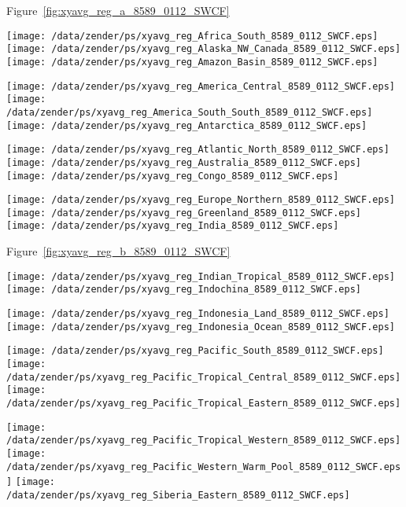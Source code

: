 \documentclass[agupp]{aguplus}
\begin{document}
Figure~\ref{fig:xyavg_reg_a_8589_0112_SWCF}
\begin{figure*}
\texttt{[image: /data/zender/ps/xyavg\_reg\_Africa\_South\_8589\_0112\_SWCF.eps]}%
\texttt{[image: /data/zender/ps/xyavg\_reg\_Alaska\_NW\_Canada\_8589\_0112\_SWCF.eps]}%
\texttt{[image: /data/zender/ps/xyavg\_reg\_Amazon\_Basin\_8589\_0112\_SWCF.eps]}%

\texttt{[image: /data/zender/ps/xyavg\_reg\_America\_Central\_8589\_0112\_SWCF.eps]}%
\texttt{[image: /data/zender/ps/xyavg\_reg\_America\_South\_South\_8589\_0112\_SWCF.eps]}%
\texttt{[image: /data/zender/ps/xyavg\_reg\_Antarctica\_8589\_0112\_SWCF.eps]}%

\texttt{[image: /data/zender/ps/xyavg\_reg\_Atlantic\_North\_8589\_0112\_SWCF.eps]}%
\texttt{[image: /data/zender/ps/xyavg\_reg\_Australia\_8589\_0112\_SWCF.eps]}%
\texttt{[image: /data/zender/ps/xyavg\_reg\_Congo\_8589\_0112\_SWCF.eps]}%

\texttt{[image: /data/zender/ps/xyavg\_reg\_Europe\_Northern\_8589\_0112\_SWCF.eps]}%
\texttt{[image: /data/zender/ps/xyavg\_reg\_Greenland\_8589\_0112\_SWCF.eps]}%
\texttt{[image: /data/zender/ps/xyavg\_reg\_India\_8589\_0112\_SWCF.eps]}%
\caption{Seasonal amplitude in regional shortwave cloud
forcing (\wxmS ) for ERBE, CCM, and ANV. Month 1 is January. 
\label{fig:xyavg_reg_a_8589_0112_SWCF}}   
\end{figure*}

Figure~\ref{fig:xyavg_reg_b_8589_0112_SWCF}
\begin{figure*}
\texttt{[image: /data/zender/ps/xyavg\_reg\_Indian\_Tropical\_8589\_0112\_SWCF.eps]}%
\texttt{[image: /data/zender/ps/xyavg\_reg\_Indochina\_8589\_0112\_SWCF.eps]}%

\texttt{[image: /data/zender/ps/xyavg\_reg\_Indonesia\_Land\_8589\_0112\_SWCF.eps]}%
\texttt{[image: /data/zender/ps/xyavg\_reg\_Indonesia\_Ocean\_8589\_0112\_SWCF.eps]}%

\texttt{[image: /data/zender/ps/xyavg\_reg\_Pacific\_South\_8589\_0112\_SWCF.eps]}%
\texttt{[image: /data/zender/ps/xyavg\_reg\_Pacific\_Tropical\_Central\_8589\_0112\_SWCF.eps]}%
\texttt{[image: /data/zender/ps/xyavg\_reg\_Pacific\_Tropical\_Eastern\_8589\_0112\_SWCF.eps]}%

\texttt{[image: /data/zender/ps/xyavg\_reg\_Pacific\_Tropical\_Western\_8589\_0112\_SWCF.eps]}%
\texttt{[image: /data/zender/ps/xyavg\_reg\_Pacific\_Western\_Warm\_Pool\_8589\_0112\_SWCF.eps]}%
\texttt{[image: /data/zender/ps/xyavg\_reg\_Siberia\_Eastern\_8589\_0112\_SWCF.eps]}%
\caption{Seasonal amplitude in regional shortwave cloud
forcing (\wxmS ) for ERBE, CCM, and ANV. Month 1 is January. 
\label{fig:xyavg_reg_b_8589_0112_SWCF}}   
\end{figure*}
\end{document}

